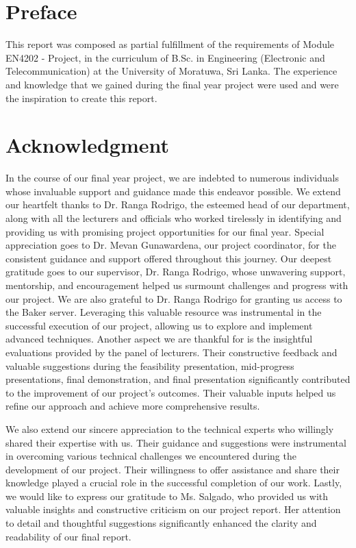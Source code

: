\documentclass[12pt]{report}
\begin{document}
\newpage
\section*{Preface}
This report was composed as partial fulfillment of the requirements of Module EN4202 - Project, in the curriculum of B.Sc. in Engineering (Electronic and Telecommunication) at the University of Moratuwa, Sri Lanka. The experience and knowledge that we gained during the final year project were used and were the inspiration to create this report.

\newpage
\section*{Acknowledgment}
In the course of our final year project, we are indebted to numerous individuals whose invaluable support and guidance made this endeavor possible. We extend our heartfelt thanks to Dr. Ranga Rodrigo, the esteemed head of our department, along with all the lecturers and officials who worked tirelessly in identifying and providing us with promising project opportunities for our final year. Special appreciation goes to Dr. Mevan Gunawardena, our project coordinator, for the consistent guidance and support offered throughout this journey. Our deepest gratitude goes to our supervisor, Dr. Ranga Rodrigo, whose unwavering support, mentorship, and encouragement helped us surmount challenges and progress with our project. We are also grateful to Dr. Ranga Rodrigo for granting us access to the Baker server. Leveraging this valuable resource was instrumental in the successful execution of our project, allowing us to explore and implement advanced techniques.
Another aspect we are thankful for is the insightful evaluations provided by the panel of lecturers. Their constructive feedback and valuable suggestions during the feasibility presentation, mid-progress presentations, final demonstration, and final presentation significantly contributed to the improvement of our project’s outcomes. Their valuable inputs helped us refine our approach and achieve more comprehensive results.

We also extend our sincere appreciation to the technical experts who willingly shared their expertise with us. Their guidance and suggestions were instrumental in overcoming various technical challenges we encountered during the development of our project. Their willingness to offer assistance and share their
knowledge played a crucial role in the successful completion of our work.
Lastly, we would like to express our gratitude to Ms. Salgado, who provided us with valuable insights and constructive criticism on our project report. Her attention to detail and thoughtful suggestions significantly enhanced the clarity and readability of our final report.
\end{document}
